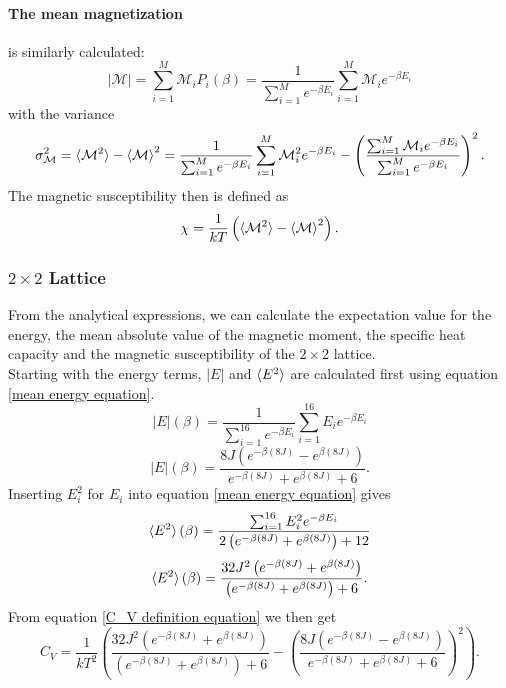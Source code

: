 \documentclass[10pt,a4paper]{article}
\begin{document}
\paragraph{The mean magnetization} is similarly calculated:
\begin{equation} \label{Mean magnetization definition equation}
 |\mathcal{M}| = \sum_{i=1}^{M} \mathcal{M}_iP_i(\beta) = \frac{1}{\sum_{i=1}^M e^{-\beta E_i}} \sum_{i=1}^M \mathcal{M}_ie^{-\beta E_i}
\end{equation} 
with the variance
\begin{equation}
\sigma_\mathcal{M}^2 = \braket{\mathcal{M}^2}-\braket{\mathcal{M}}^2 = \frac{1}{\sum_{i=1}^M e^{-\beta E_i}} \sum_{i=1}^M \mathcal{M}_i^2e^{-\beta E_i} - \left( \frac{\sum_{i=1}^M \mathcal{M}_ie^{-\beta E_i}}{\sum_{i=1}^M e^{-\beta E_i}} \right)^2.
\end{equation}
The magnetic susceptibility then is defined as
\begin{equation}\label{Magnetic susceptibility definition equation}
\chi = \frac{1}{kT} \left( \braket{\mathcal{M}^2}-\braket{\mathcal{M}}^2 \right).
\end{equation}
\subsubsection{$2\times2$ Lattice}
From the analytical expressions, we can calculate the expectation value for the energy, the mean absolute value of the magnetic moment, the specific heat capacity and the magnetic susceptibility of the $2\times 2$ lattice.\\Starting with the energy terms, $|E|$ and $\braket{E^2}$ are calculated first using equation \ref{mean energy equation}.
\begin{equation*}
|E|(\beta) = \frac{1}{\sum_{i=1}^{16} e^{-\beta E_i}} \sum_{i=1}^{16} E_ie^{-\beta E_i}
\end{equation*}
\begin{equation}
|E|(\beta) = \frac{8J\left( e^{-\beta (8J)} -e^{\beta (8J)} \right)}{ e^{-\beta (8J)} +e^{\beta (8J)} +6}.
\end{equation}
Inserting $E_i^2$ for $E_i$ into equation \ref{mean energy equation} gives
\begin{equation*}
\braket{E^2}(\beta) = \frac{\sum_{i=1}^{16} E_i^2e^{-\beta E_i}}{2\left( e^{-\beta (8J)} +e^{\beta (8J)} \right)+12}
\end{equation*}
\begin{equation}
\braket{E^2}(\beta) = \frac{32J^2\left( e^{-\beta (8J)} +e^{\beta (8J)} \right)}{\left( e^{-\beta (8J)} +e^{\beta (8J)} \right)+6}.
\end{equation}
From equation \ref{C_V definition equation} we then get
\begin{equation}
C_V = \frac{1}{kT^2}\left( \frac{32J^2\left( e^{-\beta (8J)} +e^{\beta (8J)} \right)}{\left( e^{-\beta (8J)} +e^{\beta (8J)} \right)+6}  - \left( \frac{8J\left( e^{-\beta (8J)} -e^{\beta (8J)} \right)}{ e^{-\beta (8J)} +e^{\beta (8J)} +6} \right)^2 \right).
\end{equation}
\end{document}
